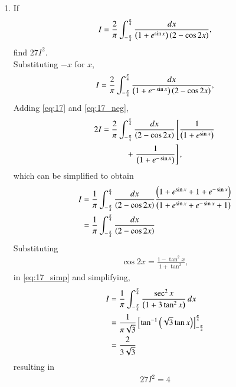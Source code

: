\documentclass[journal,12pt,twocolumn]{IEEEtran}
\renewcommand\thesection{\arabic{section}}
\begin{document}
\begin{enumerate}[label=\thesection.\arabic*
,ref=\thesection.\theenumi]

\item If 
\begin{align}
\label{eq:17}
I = \frac{2}{\pi}\int_{-\frac{\pi}{4}}^{\frac{\pi}{4}}\frac{dx}{\left(1+e^{\sin x}\right)\left(2-\cos 2x\right)},
\end{align}
find $27 I^2$.
\\
\solution Substituting $-x$ for $x$,
\begin{align}
\label{eq:17_neg}
I = \frac{2}{\pi}\int_{-\frac{\pi}{4}}^{\frac{\pi}{4}}\frac{dx}{\left(1+e^{-\sin x}\right)\left(2-\cos 2x\right)},
\end{align}
Adding \eqref{eq:17} and \eqref{eq:17_neg},
\begin{multline}
\label{eq:17_sum}
2I = \frac{2}{\pi}\int_{-\frac{\pi}{4}}^{\frac{\pi}{4}}\frac{dx}{\left(2-\cos 2x\right)}{}\left[\frac{1}{\left(1+e^{\sin x}\right)}\right.
\\
+{}\left.\frac{1}{\left(1+e^{-\sin x}\right)}\right],
\end{multline}
%
which can be simplified to obtain
\begin{align}
I &= \frac{1}{\pi}\int_{-\frac{\pi}{4}}^{\frac{\pi}{4}}\frac{dx}{\left(2-\cos 2x\right)}\frac{\left(1+e^{\sin x}+1+e^{-\sin x}\right)}{\left(1+e^{\sin x}+e^{-\sin x}+1\right)}
\nonumber \\
&= \frac{1}{\pi}\int_{-\frac{\pi}{4}}^{\frac{\pi}{4}}\frac{dx}{\left(2-\cos 2x\right)}
\label{eq:17_simp}
\end{align}
%
Substituting
\begin{align}
\cos 2x = \frac{1-\tan^2 x}{1+\tan^2},
\end{align}
in \eqref{eq:17_simp} and simplifying,
\begin{align}
I&= \frac{1}{\pi}\int_{-\frac{\pi}{4}}^{\frac{\pi}{4}}\frac{\sec^2x}{\left(1+3\tan^2 x\right)}\,dx
\nonumber \\
&= \frac{1}{\pi\sqrt{3}}{}\left[\tan^{-1}\left(\sqrt{3}\tan x\right)\right]_{-\frac{\pi}{4}}^{\frac{\pi}{4}}
\nonumber \\
&= \frac{2}{3\sqrt{3}}
\label{eq:17_sol}
\end{align}
resulting in 
\begin{align}
27I^2 = 4
\end{align}
\end{enumerate}
\end{document}
